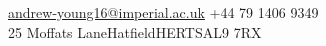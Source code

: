\documentclass[10pt,a4paper]{article}
\begin{document}


\noindent\href{mailto:andrew-young16@imperial.ac.uk}{andrew-young16@imperial.ac.uk}\bull
+44 79 1406 9349\bull
\\

25 Moffats Lane\bull Hatfield\bull HERTS\bull AL9 7RX

\spacedhrule{0.9em}{-0.4em}
\end{document}
